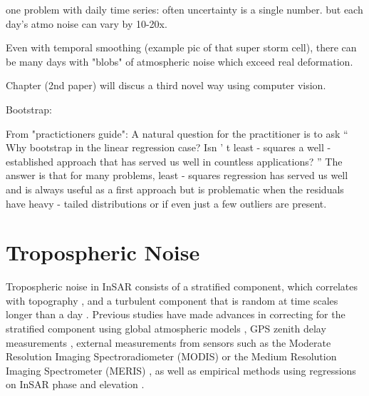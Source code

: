 \documentclass{utexasthesis}
\begin{document}
one problem with daily time series: often uncertainty is a single number. but each day's atmo noise can vary by 10-20x.

Even with temporal smoothing (example pic of that super storm cell), there can be many days with "blobs" of atmospheric noise which exceed real deformation.

Chapter (2nd paper) will discus a third novel way using computer vision.


Bootstrap:

From "practictioners guide":
A natural question for the practitioner is to ask  “ Why bootstrap in the linear regression case? Isn ’ t least - squares a well - established approach that  has  served  us  well  in  countless  applications? ”   The  answer  is  that  for  many  problems, least - squares regression has served us well and is always useful as  a first approach but is problematic when the residuals have heavy - tailed distributions or if even just a few outliers are present.



\section{Tropospheric Noise}


Tropospheric noise in InSAR consists of a stratified component, which correlates with topography \cite{Doin2009CorrectionsStratifiedTropospheric}, and a turbulent component that is random at time scales longer than a day \cite{Emardson2003NeutralAtmosphericDelay, Onn2006ModelingWaterVapor}. Previous studies have made advances in correcting for the stratified component using global atmospheric models \cite{Doin2009CorrectionsStratifiedTropospheric, Jolivet2014ImprovingInsarGeodesy, Cao2021AdvancedInsarTropospheric}, GPS zenith delay measurements \cite{Onn2006ModelingWaterVapor}, external measurements from sensors such as the Moderate Resolution Imaging Spectroradiometer (MODIS) \cite{Li2005InterferometricSyntheticAperture, Barnhart2013CharacterizingEstimatingNoise} or the Medium Resolution Imaging Spectrometer (MERIS)  \cite{Ding2008AtmosphericEffectsInsar}, as well as empirical methods using regressions on InSAR phase and elevation \cite{Zebker2021AccuracyModelFree, Murray2021ClusterBasedEmpirical}.
\end{document}
